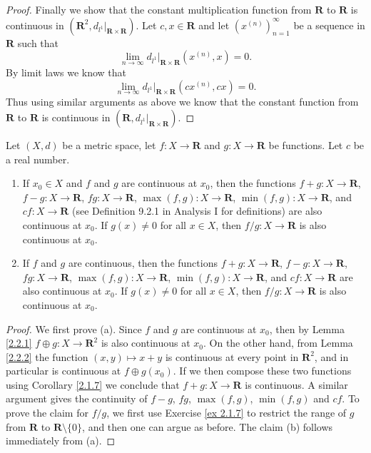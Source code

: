 \begin{proof}
    Finally we show that the constant multiplication function from \(\mathbf{R}\) to \(\mathbf{R}\) is continuous in \((\mathbf{R}^2, d_{l^1}|_{\mathbf{R} \times \mathbf{R}})\).
    Let \(c, x \in \mathbf{R}\) and let \((x^{(n)})_{n = 1}^\infty\) be a sequence in \(\mathbf{R}\) such that
    \[
        \lim_{n \to \infty} d_{l^1}|_{\mathbf{R} \times \mathbf{R}}(x^{(n)}, x) = 0.
    \]
    By limit laws we know that
    \[
        \lim_{n \to \infty} d_{l^1}|_{\mathbf{R} \times \mathbf{R}}(cx^{(n)}, cx) = 0.
    \]
    Thus using similar arguments as above we know that the constant function from \(\mathbf{R}\) to \(\mathbf{R}\) is continuous in \((\mathbf{R}, d_{l^1}|_{\mathbf{R} \times \mathbf{R}})\).
\end{proof}

\begin{corollary}\label{2.2.3}
    Let \((X, d)\) be a metric space, let \(f : X \to \mathbf{R}\) and \(g : X \to \mathbf{R}\) be functions.
    Let \(c\) be a real number.
    \begin{enumerate}
        \item If \(x_0 \in X\) and \(f\) and \(g\) are continuous at \(x_0\), then the functions \(f + g : X \to \mathbf{R}\), \(f - g : X \to \mathbf{R}\), \(fg : X \to \mathbf{R}\), \(\max(f, g) : X \to \mathbf{R}\), \(\min(f, g) : X \to \mathbf{R}\), and \(cf : X \to \mathbf{R}\) (see Definition 9.2.1 in Analysis I for definitions) are also continuous at \(x_0\).
              If \(g(x) \neq 0\) for all \(x \in X\), then \(f / g : X \to \mathbf{R}\) is also continuous at \(x_0\).
        \item If \(f\) and \(g\) are continuous, then the functions \(f + g : X \to \mathbf{R}\), \(f - g : X \to \mathbf{R}\), \(fg : X \to \mathbf{R}\), \(\max(f, g) : X \to \mathbf{R}\), \(\min(f, g) : X \to \mathbf{R}\), and \(cf : X \to \mathbf{R}\) are also continuous at \(x_0\).
              If \(g(x) \neq 0\) for all \(x \in X\), then \(f / g : X \to \mathbf{R}\) is also continuous at \(x_0\).
    \end{enumerate}
\end{corollary}

\begin{proof}
    We first prove (a). Since \(f\) and \(g\) are continuous at \(x_0\), then by Lemma \ref{2.2.1} \(f \oplus g : X \to \mathbf{R}^2\) is also continuous at \(x_0\).
    On the other hand, from Lemma \ref{2.2.2} the function \((x, y) \mapsto x + y\) is continuous at every point in \(\mathbf{R}^2\), and in particular is continuous at \(f \oplus g(x_0)\).
    If we then compose these two functions using Corollary \ref{2.1.7} we conclude that \(f + g : X \to \mathbf{R}\) is continuous.
    A similar argument gives the continuity of \(f - g\), \(fg\), \(\max(f, g)\), \(\min(f, g)\) and \(cf\).
    To prove the claim for \(f / g\), we first use Exercise \ref{ex 2.1.7} to restrict the range of \(g\) from \(\mathbf{R}\) to \(\mathbf{R} \setminus \{0\}\), and then one can argue as before.
    The claim (b) follows immediately from (a).
\end{proof}


